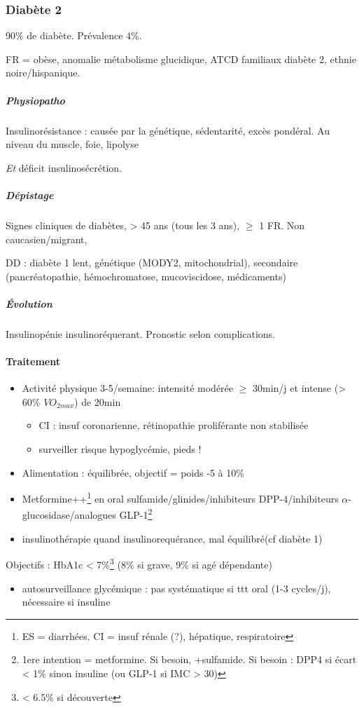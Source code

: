 \documentclass[11pt]{article}
\begin{document}
\subsubsection{Diabète 2}
\label{sec:orgaa41ab8}
90\% de diabète. Prévalence 4\%. 

FR = obèse, anomalie métabolisme glucidique, ATCD familiaux diabète 2, ethnie noire/hispanique.

\subparagraph{Physiopatho}
\label{sec:org3443202}
Insulinorésistance : causée par la génétique, sédentarité, excès pondéral. Au niveau du muscle, foie, lipolyse

\emph{Et} déficit insulinosécrétion. 

\subparagraph{Dépistage}
\label{sec:org8883028}
Signes cliniques de diabètes, > 45 ans (tous les 3 ans), \(\ge\) 1 FR. 
 Non caucasien/migrant, 

DD : diabète 1 lent, génétique (MODY2, mitochondrial), secondaire (pancréatopathie, hémochromatose,
mucoviscidose, médicaments)

\subparagraph{Évolution}
\label{sec:orgdf1f597}
Insulinopénie \thus insulinoréquerant. Pronostic selon complications.

\paragraph{Traitement}
\label{sec:org74514eb}
\begin{itemize}
\item Activité physique 3-5/semaine: intensité modérée \(\ge\) 30min/j et intense (> 60\% \(VO_{2max}\)) de 20min
\begin{itemize}
\item CI : insuf coronarienne, rétinopathie proliférante non stabilisée
\item surveiller risque hypoglycémie, pieds !
\end{itemize}
\item Alimentation : équilibrée, objectif = poids -5 à 10\%
\item Metformine++\footnote{ES = diarrhées. CI = insuf rénale (?), hépatique, respiratoire} en oral \textpm{} sulfamide/glinides/inhibiteurs
DPP-4/inhibiteurs \(\alpha\)-glucosidase/analogues GLP-1\footnote{1ere intention = metformine. Si besoin, +sulfamide. Si besoin : DPP4 si
écart < 1\% sinon insuline (ou GLP-1 si IMC > 30)}
\item \textpm{} insulinothérapie quand insulinorequérance, mal équilibré(cf diabète 1)
\end{itemize}
Objectifs : HbA1c < 7\%\footnote{< 6.5\% si découverte} (8\% si grave, 9\% si agé dépendante)
\begin{itemize}
\item autosurveillance glycémique : pas systématique si ttt oral (1-3 cycles/j),
nécessaire si insuline
\end{itemize}
\end{document}
